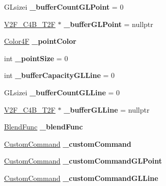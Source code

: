 \begin{DoxyCompactItemize}
G\+Lsizei {\bfseries \+\_\+buffer\+Count\+G\+L\+Point} = 0
\item 
\mbox{\label{classDrawNode_afa7d7d79232db53000a25b77553b434f}} 
\hyperlink{structV2F__C4B__T2F}{V2\+F\+\_\+\+C4\+B\+\_\+\+T2F} $\ast$ {\bfseries \+\_\+buffer\+G\+L\+Point} = nullptr
\item 
\mbox{\label{classDrawNode_a9c1586452bd79811235c83a5e3f35205}} 
\hyperlink{structColor4F}{Color4F} {\bfseries \+\_\+point\+Color}
\item 
\mbox{\label{classDrawNode_aa931897019898aa59cd5eb27c1331f04}} 
int {\bfseries \+\_\+point\+Size} = 0
\item 
\mbox{\label{classDrawNode_a69404f15a27ea9a4f5527a91bde1eca8}} 
int {\bfseries \+\_\+buffer\+Capacity\+G\+L\+Line} = 0
\item 
\mbox{\label{classDrawNode_ad95723387f9369a09245a2bbe80461aa}} 
G\+Lsizei {\bfseries \+\_\+buffer\+Count\+G\+L\+Line} = 0
\item 
\mbox{\label{classDrawNode_a590ea62440ab73eda483df3a7c180954}} 
\hyperlink{structV2F__C4B__T2F}{V2\+F\+\_\+\+C4\+B\+\_\+\+T2F} $\ast$ {\bfseries \+\_\+buffer\+G\+L\+Line} = nullptr
\item 
\mbox{\label{classDrawNode_a0c88b17dbd9aa1c8a192c02e24c2ea11}} 
\hyperlink{structBlendFunc}{Blend\+Func} {\bfseries \+\_\+blend\+Func}
\item 
\mbox{\label{classDrawNode_a4a00b2fcd1d0faae30218f159a1f10f1}} 
\hyperlink{classCustomCommand}{Custom\+Command} {\bfseries \+\_\+custom\+Command}
\item 
\mbox{\label{classDrawNode_a1f5e7fc51ec09ff32a8bc7a23d083921}} 
\hyperlink{classCustomCommand}{Custom\+Command} {\bfseries \+\_\+custom\+Command\+G\+L\+Point}
\item 
\mbox{\label{classDrawNode_adcb6cf4ce769804cca7c3181c068050f}} 
\hyperlink{classCustomCommand}{Custom\+Command} {\bfseries \+\_\+custom\+Command\+G\+L\+Line}
\item 

\end{DoxyCompactItemize}
